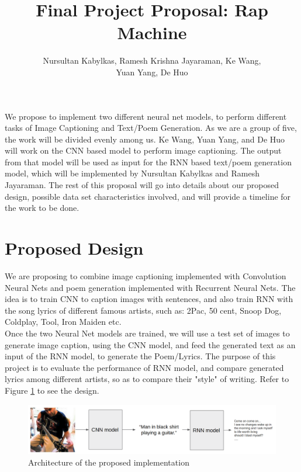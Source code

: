 \documentclass[a4paper,10pt]{article}
\title{Final Project Proposal: Rap Machine}
\author{Nursultan Kabylkas, Ramesh Krishna Jayaraman, Ke Wang,\\ Yuan Yang, De Huo}
\begin{document}
\maketitle


We propose to implement two different neural net models, to perform different tasks of Image Captioning and Text/Poem Generation. As we are a group of five, the work will be divided evenly among us. Ke Wang, Yuan Yang, and De Huo will work on the CNN based model to perform image captioning. The output from that model will be used as input for the RNN based text/poem generation model, which will be implemented by Nursultan Kabylkas and Ramesh Jayaraman. The rest of this proposal will go into details about our proposed design, possible data set characteristics involved, and will provide a timeline for the work to be done. \\

\section{Proposed Design}

We are proposing to combine image captioning implemented with Convolution Neural Nets and poem generation implemented with Recurrent Neural Nets. 
The idea is to train CNN to caption images with sentences, and also train RNN with the song lyrics of different famous artists, such as: 2Pac, 50 cent, Snoop Dog, Coldplay, Tool, Iron Maiden etc. \\

Once the two Neural Net models are trained, we will use a test set of images to generate image caption, using the CNN model, and feed the generated text as an input of the RNN model, to generate the Poem/Lyrics. The purpose of this project is to evaluate the performance of RNN model, and compare generated lyrics among different artists, so as to compare their "style" of writing. 
Refer to Figure \ref{fig:architecture} to see the design.\\

\begin{figure}[h]
\includegraphics[scale=0.18]{figure1}
\caption{Architecture of the proposed implementation}
\label{fig:architecture}
\end{figure}
\end{document}
